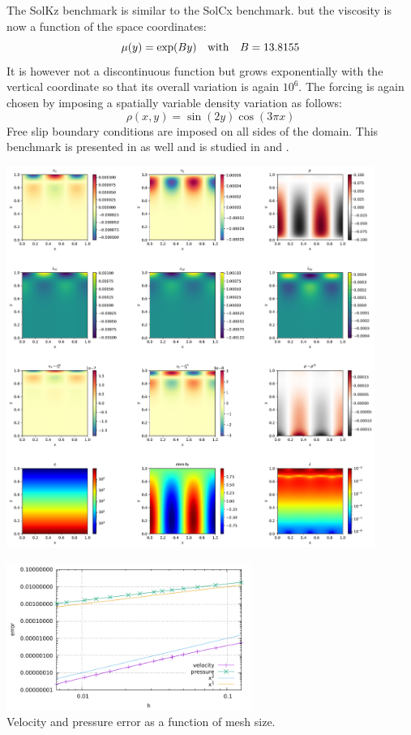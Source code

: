 
The SolKz benchmark \cite{repa87} is similar to the SolCx benchmark.
but the viscosity is now a function of the space coordinates: 
\begin{equation}
\mu(y)=\exp(By) \quad {\rm with} \quad B=13.8155
\end{equation}
It is however not a discontinuous function but grows exponentially with the vertical coordinate so that its overall variation is again $10^6$. 
The forcing is again chosen by imposing a spatially variable density variation as follows:
\begin{equation}
\rho(x,y)=\sin(2y) \cos(3\pi x)
\end{equation}
Free slip boundary conditions are imposed on all sides of the domain.
This benchmark is presented in \cite{zhon96} as well and is studied in \cite{dumg11} and \cite{gemd13}.

\includegraphics[width=12cm]{python_codes/fieldstone_06/results/solution.pdf}

\begin{center}
\includegraphics[width=8cm]{python_codes/fieldstone_06/results/errors.pdf}\\
{\captionfont Velocity and pressure error as a function of mesh size.}
\end{center}
